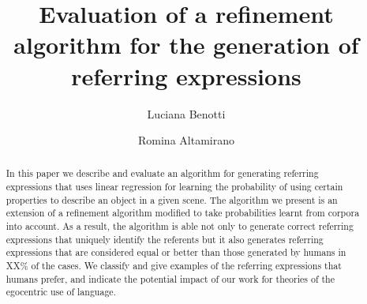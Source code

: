\documentclass{llncs}
\begin{document}
\mainmatter              %
%
\title{Evaluation of a refinement algorithm for the generation of referring expressions}
%
%
\author{Luciana Benotti \and Romina Altamirano}
%
%

\maketitle              %

\begin{abstract}
In this paper we describe and evaluate an algorithm for generating referring expressions that uses linear regression for learning the probability of using certain properties to describe an object in a given scene. The  algorithm we present is an extension of a refinement algorithm modified to take probabilities learnt from corpora into account. As a result, the algorithm is able not only to generate correct referring expressions that uniquely identify the referents but it also generates referring expressions that are considered equal or better than those generated by humans in XX\% of the cases. We classify and give examples of the referring expressions that humans prefer, and indicate the potential impact of our work for theories of the egocentric use of language. 
\end{abstract}
%



%






\end{document}
